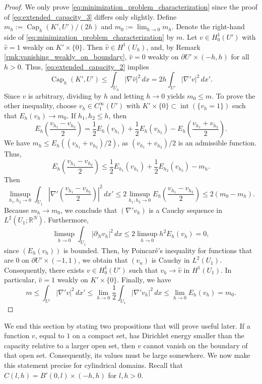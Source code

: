 \documentclass{article}
\numberwithin{equation}{section}
\theoremstyle{definition}
\theoremstyle{remark}
\newcommand{\cpct}{\operatorname{Cap}}
\newcommand{\topint}{\operatorname{int}}
\begin{document}
\begin{proof}
    We only prove \eqref{eq:minimization_problem_characterization} since the proof of \eqref{eq:extended_capacity_3} differs only slightly. Define $m_h := \cpct_h(K', U')/(2h)$ and $m_0 := \lim_{h \to 0} m_h$. Denote the right-hand side of \eqref{eq:minimization_problem_characterization} by $m$. Let $v \in H_0^1(U')$ with $\hat{v} = 1$ weakly on $K' \times \{0\}$. Then $\hat{v} \in H^1(U_h)$, and, by Remark \ref{rmk:vanishing_weakly_on_boundary}, $\hat{v} = 0$ weakly on $\partial U' \times (-h, h)$ for all $h > 0$. Thus, \eqref{eq:extended_capacity_2} implies
    \[
    \cpct_h(K', U') \le \int_{U_h} |\nabla \hat{v}|^2 \, dx = 2h \int_{U'} |\nabla' v|^2 \, dx'.
    \]
    Since $v$ is arbitrary, dividing by $h$ and letting $h \to 0$ yields $m_0 \le m$. To prove the other inequality, choose $v_h \in C_1^\infty(U')$ with $K' \times \{0\} \subset \topint(\{v_h = 1\})$ such that $E_h(v_h) \to m_0$. If $h_1, h_2 \le h$, then
    \[
    E_h\left(\frac{v_{h_1} - v_{h_2}}{2}\right) = \frac{1}{2}E_h(v_{h_1}) + \frac{1}{2}E_h(v_{h_2}) - E_h\left(\frac{v_{h_1} + v_{h_2}}{2}\right).
    \]
    We have $m_h \le E_h((v_{h_1} + v_{h_2})/2)$, as $(v_{h_1} + v_{h_2})/2$ is an admissible function. Thus,
    \[
    E_h\left(\frac{v_{h_1} - v_{h_2}}{2}\right) \le \frac{1}{2}E_{h_1}(v_{h_1}) + \frac{1}{2}E_{h_2}(v_{h_2}) - m_h.
    \]
    Then
    \[
    \limsup_{h_1, h_2 \to 0} \int_{U_1} \left|\nabla' \left(\frac{v_{h_1} - v_{h_2}}{2}\right)\right|^2 \, dx' \le 2 \limsup_{h_1, h_2 \to 0} E_h\left(\frac{v_{h_1} - v_{h_2}}{2}\right) \le 2(m_0 - m_h).
    \]
    Because $m_h \to m_0$, we conclude that $(\nabla' v_h)$ is a Cauchy sequence in $L^2(U_1; \mathbb{R}^N)$. Furthermore,
    \[
    \limsup_{h \to 0} \int_{U_1} |\partial_N v_h|^2 \, dx \le 2 \limsup_{h \to 0} h^2 E_h(v_h) = 0,
    \]
    since $(E_h(v_h))$ is bounded. Then, by Poincaré's inequality for functions that are $0$ on $\partial U' \times (-1, 1)$, we obtain that $(v_n)$ is Cauchy in $L^2(U_1)$. Consequently, there exists $v \in H_0^1(U')$ such that $v_h \to \hat{v}$ in $H^1(U_1)$. In particular, $\hat{v} = 1$ weakly on $K' \times \{0\}$. Finally, we have
    \[
    m \le \int_{U'} |\nabla' v|^2 \, dx' \le \lim_{h \to 0} \frac{1}{2} \int_{U_1} |\nabla' v_h|^2 \, dx \le \lim_{h \to 0} E_h(v_h) = m_0.
    \]
\end{proof}

We end this section by stating two propositions that will prove useful later. If a function $v$, equal to $1$ on a compact set, has Dirichlet energy smaller than the capacity relative to a larger open set, then $v$ cannot vanish on the boundary of that open set. Consequently, its values must be large somewhere. We now make this statement precise for cylindrical domains. Recall that $C(l, h) = B'(0, l) \times (-h, h)$ for $l, h > 0$.
\end{document}
